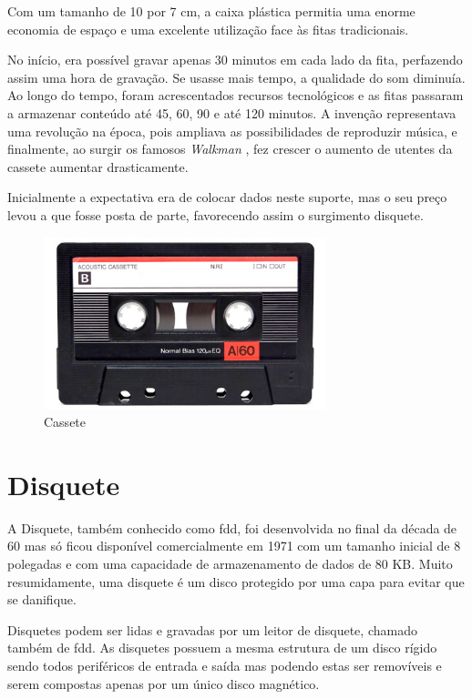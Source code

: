 \documentclass{report}
\begin{document}
	Com um tamanho de 10 por 7 cm, a caixa plástica permitia uma enorme economia de espaço e uma excelente utilização face às fitas tradicionais.
\vspace{1mm}

	No início, era possível gravar apenas 30 minutos em cada lado da fita, perfazendo assim uma hora de gravação. Se usasse mais tempo, a qualidade do som diminuía. Ao longo do tempo, foram acrescentados recursos tecnológicos e as fitas passaram a armazenar conteúdo até 45, 60, 90 e até 120 minutos. A invenção representava uma revolução na época, pois ampliava as possibilidades de reproduzir música, e finalmente, ao surgir os famosos \textit{Walkman}  , fez crescer o aumento de utentes da cassete aumentar drasticamente.
\vspace{1mm}

	Inicialmente a expectativa era de colocar dados neste suporte, mas o seu preço levou a que fosse posta de parte, favorecendo assim o surgimento disquete.
	
	\begin{figure} [h]
		\centering
		\includegraphics[width=8.19cm, height=5cm]{cassete.jpg}
		\caption{Cassete}
	\end{figure}		
		
\newpage

		\section{Disquete}
		A Disquete, também conhecido como \ac{fdd}, foi desenvolvida no final da década de 60 mas só ficou disponível comercialmente em 1971 com um tamanho inicial de 8 polegadas e com uma capacidade de armazenamento de dados de 80 KB. Muito resumidamente, uma disquete é um disco protegido por uma capa para evitar que se danifique. 
\vspace{1mm}

		Disquetes podem ser lidas e gravadas por um leitor de disquete, chamado também de \ac{fdd}. As disquetes possuem a mesma estrutura de um disco rígido sendo todos periféricos de entrada e saída mas podendo estas ser removíveis e serem compostas apenas por um único disco magnético.
\vspace{1mm}
		
\end{document}
